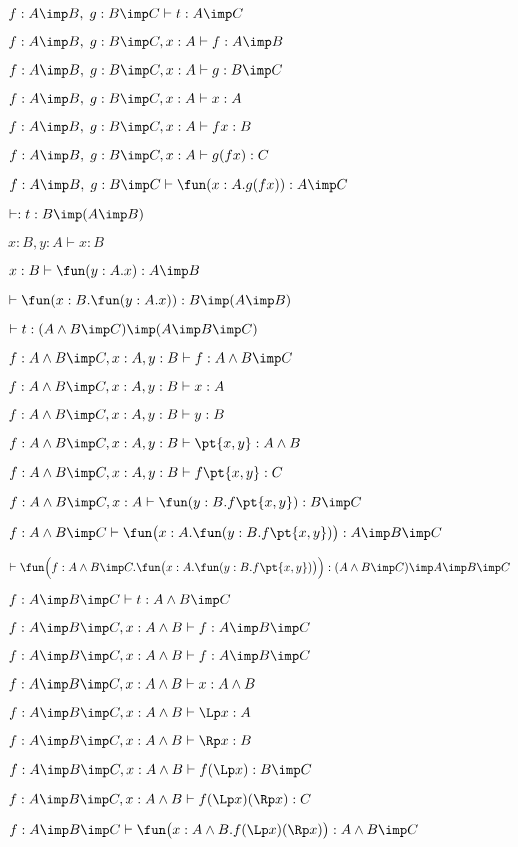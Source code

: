 \documentclass[11pt,letterpaper]{article}
\begin{document}
\item $f:A\imp B,\;g:B\imp C\vdash t: A\imp C$
  \be
  \item $f:A\imp B,\;g:B\imp C, x:A \vdash f: A\imp B$
    \item $f:A\imp B,\;g:B\imp C, x:A\vdash g: B\imp C$
      \item $f:A\imp B,\;g:B\imp C, x:A\vdash x:A$
        \item $f:A\imp B,\;g:B\imp C, x:A\vdash fx:B$
          \item $f:A\imp B,\;g:B\imp C, x:A\vdash g(fx):C$
            \item $f:A\imp B,\;g:B\imp C\vdash \fun(x:A.g(fx)):A\imp C$
  \ee

\item $\vdash: t: B\imp (A\imp B)$
  \be
  \item $x:B,y:A\vdash x:B$
    \item $x:B\vdash\fun(y:A.x):A\imp B$
      \item $\vdash\fun(x:B.\fun(y:A.x)):B\imp (A\imp B)$
      
  \ee

\item $\vdash t: (A\land B\imp C)\imp (A\imp B\imp C)$
  \be
  \item $f:A\land B\imp C, x:A, y:B\vdash f:A\land B\imp C $
    \item $f:A\land B\imp C, x:A, y:B\vdash x:A$
      \item $f:A\land B\imp C, x:A, y:B\vdash y:B$
        \item $f:A\land B\imp C, x:A, y:B\vdash\pt{x,y}:A\land B$
         \item $f:A\land B\imp C, x:A, y:B\vdash f\pt{x,y}:C$
           \item $f:A\land B\imp C, x:A \vdash
             \fun(y:B.f\pt{x,y}):B\imp C$
              \item $f:A\land B\imp C \vdash
             \fun\big(x:A.\fun(y:B.f\pt{x,y})\big):A\imp B\imp C$
             \item $\vdash
             \fun\Big(f:A\land B\imp
             C.\fun\big(x:A.\fun(y:B.f\pt{x,y})\big)\Big): (A\land
             B\imp C)\imp A\imp B\imp C$ 
  \ee

  \item $f:A\imp B\imp C\vdash t: A\land B\imp C$
    \be
    \item $f:A\imp B\imp C, x: A\land B\vdash f:A\imp B\imp C$
      \item $f:A\imp B\imp C, x: A\land B\vdash f:A\imp B\imp C$
        \item $f:A\imp B\imp C, x: A\land B\vdash x:A\land B$
          \item $f:A\imp B\imp C, x: A\land B\vdash \Lp x:A$
            \item $f:A\imp B\imp C, x: A\land B\vdash \Rp x:B$
              \item $f:A\imp B\imp C, x: A\land B\vdash f(\Lp x):B\imp
                C$
                \item $f:A\imp B\imp C, x: A\land B\vdash f(\Lp x)(\Rp
                  x):
                C$
                \item $f:A\imp B\imp C\vdash \fun\big( x: A\land B.f(\Lp x)(\Rp
                  x)\big): A\land B\imp C$
              
\end{document}
